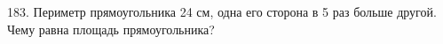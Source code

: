 183. Периметр прямоугольника 24 см, одна его сторона в 5 раз больше другой. Чему равна площадь прямоугольника?\\
